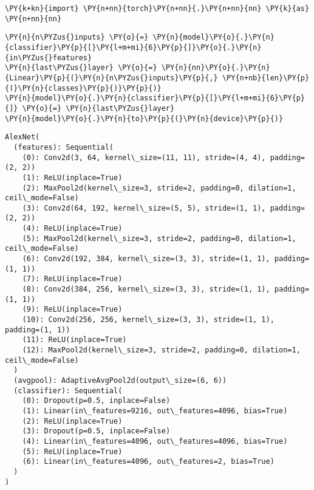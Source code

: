     \begin{tcolorbox}[breakable, size=fbox, boxrule=1pt, pad at break*=1mm,colback=cellbackground, colframe=cellborder]
\begin{Verbatim}[commandchars=\\\{\}]
\PY{k+kn}{import} \PY{n+nn}{torch}\PY{n+nn}{.}\PY{n+nn}{nn} \PY{k}{as} \PY{n+nn}{nn}
\end{Verbatim}
\end{tcolorbox}

    \begin{tcolorbox}[breakable, size=fbox, boxrule=1pt, pad at break*=1mm,colback=cellbackground, colframe=cellborder]
\begin{Verbatim}[commandchars=\\\{\}]
\PY{n}{n\PYZus{}inputs} \PY{o}{=} \PY{n}{model}\PY{o}{.}\PY{n}{classifier}\PY{p}{[}\PY{l+m+mi}{6}\PY{p}{]}\PY{o}{.}\PY{n}{in\PYZus{}features}
\PY{n}{last\PYZus{}layer} \PY{o}{=} \PY{n}{nn}\PY{o}{.}\PY{n}{Linear}\PY{p}{(}\PY{n}{n\PYZus{}inputs}\PY{p}{,} \PY{n+nb}{len}\PY{p}{(}\PY{n}{classes}\PY{p}{)}\PY{p}{)}
\PY{n}{model}\PY{o}{.}\PY{n}{classifier}\PY{p}{[}\PY{l+m+mi}{6}\PY{p}{]} \PY{o}{=} \PY{n}{last\PYZus{}layer}
\PY{n}{model}\PY{o}{.}\PY{n}{to}\PY{p}{(}\PY{n}{device}\PY{p}{)}
\end{Verbatim}
\end{tcolorbox}

            \begin{tcolorbox}[breakable, size=fbox, boxrule=.5pt, pad at break*=1mm, opacityfill=0]
\begin{Verbatim}[commandchars=\\\{\}]
AlexNet(
  (features): Sequential(
    (0): Conv2d(3, 64, kernel\_size=(11, 11), stride=(4, 4), padding=(2, 2))
    (1): ReLU(inplace=True)
    (2): MaxPool2d(kernel\_size=3, stride=2, padding=0, dilation=1,
ceil\_mode=False)
    (3): Conv2d(64, 192, kernel\_size=(5, 5), stride=(1, 1), padding=(2, 2))
    (4): ReLU(inplace=True)
    (5): MaxPool2d(kernel\_size=3, stride=2, padding=0, dilation=1,
ceil\_mode=False)
    (6): Conv2d(192, 384, kernel\_size=(3, 3), stride=(1, 1), padding=(1, 1))
    (7): ReLU(inplace=True)
    (8): Conv2d(384, 256, kernel\_size=(3, 3), stride=(1, 1), padding=(1, 1))
    (9): ReLU(inplace=True)
    (10): Conv2d(256, 256, kernel\_size=(3, 3), stride=(1, 1), padding=(1, 1))
    (11): ReLU(inplace=True)
    (12): MaxPool2d(kernel\_size=3, stride=2, padding=0, dilation=1,
ceil\_mode=False)
  )
  (avgpool): AdaptiveAvgPool2d(output\_size=(6, 6))
  (classifier): Sequential(
    (0): Dropout(p=0.5, inplace=False)
    (1): Linear(in\_features=9216, out\_features=4096, bias=True)
    (2): ReLU(inplace=True)
    (3): Dropout(p=0.5, inplace=False)
    (4): Linear(in\_features=4096, out\_features=4096, bias=True)
    (5): ReLU(inplace=True)
    (6): Linear(in\_features=4096, out\_features=2, bias=True)
  )
)
\end{Verbatim}
\end{tcolorbox}
        
